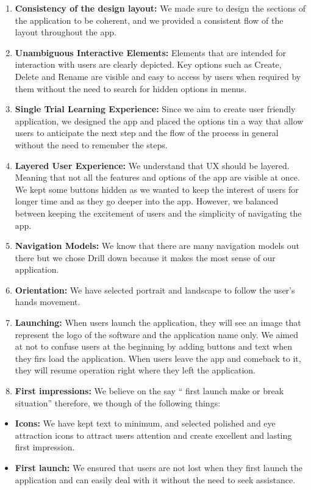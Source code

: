 \documentclass{article}
\begin{document}
\begin{enumerate}
\item \textbf{Consistency of the design layout:} We made sure to design the sections of the application to be coherent, and we provided a consistent flow of the layout throughout the app.
\item \textbf{Unambiguous Interactive Elements:} Elements that are intended for interaction with users are clearly depicted. Key options such as Create, Delete and Rename are visible and easy to access by users when required by them without the need to search for hidden options in menus.
\item \textbf{Single Trial Learning Experience:}  Since we aim to create user friendly application, we designed the app and placed the options tin a way that allow users to anticipate the next step and the flow of the process in general without the need to remember the steps.
\item \textbf{Layered User Experience:} We understand that UX should be layered. Meaning that not all the features and options of the app are visible at once. We kept some buttons hidden as we wanted to keep the interest of users for longer time and as they go deeper into the app. However, we balanced between keeping the excitement of users and the simplicity of navigating the app.
\item \textbf{Navigation Models:} We know that there are many navigation models out there but we chose Drill down because it makes the most sense of our application.
\item \textbf{Orientation:} We have selected portrait and landscape to follow the user's hands movement.
\item \textbf{Launching:} When users launch the application, they will see an image that represent the logo of the software and the application name only. We aimed at not to confuse users at the beginning by adding buttons and text when they firs load the application. When users leave the app and comeback to it, they will resume operation right where they left the application.
\item \textbf{First impressions:} We believe on the say “ first launch make or break situation” therefore, we though of the following things:
\end{enumerate}
\begin{itemize}
\item \textbf{Icons:} We have kept text to minimum, and selected polished and eye attraction icons to attract users attention and create excellent and lasting first impression.
\item \textbf{First launch:} We ensured that users are not lost when they first launch the application and can easily deal with it without the need to seek assistance.
\end{itemize}
\end{document}
